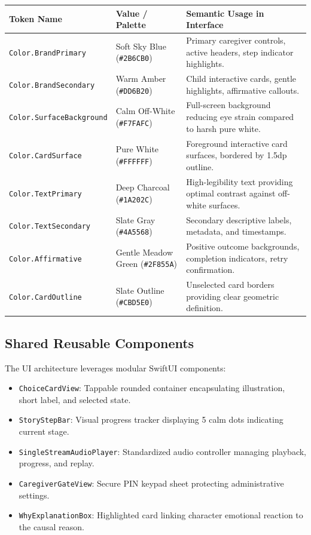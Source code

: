 \begin{xltabular}{\textwidth}{|p{3.2cm}|p{3.0cm}|X|}
\hline
\textbf{Token Name} & \textbf{Value / Palette} & \textbf{Semantic Usage in Interface} \\ \hline
\endhead
\texttt{Color.BrandPrimary} & Soft Sky Blue (\texttt{\#2B6CB0}) & Primary caregiver controls, active headers, step indicator highlights. \\ \hline
\texttt{Color.BrandSecondary} & Warm Amber (\texttt{\#DD6B20}) & Child interactive cards, gentle highlights, affirmative callouts. \\ \hline
\texttt{Color.SurfaceBackground} & Calm Off-White (\texttt{\#F7FAFC}) & Full-screen background reducing eye strain compared to harsh pure white. \\ \hline
\texttt{Color.CardSurface} & Pure White (\texttt{\#FFFFFF}) & Foreground interactive card surfaces, bordered by 1.5dp outline. \\ \hline
\texttt{Color.TextPrimary} & Deep Charcoal (\texttt{\#1A202C}) & High-legibility text providing optimal contrast against off-white surfaces. \\ \hline
\texttt{Color.TextSecondary} & Slate Gray (\texttt{\#4A5568}) & Secondary descriptive labels, metadata, and timestamps. \\ \hline
\texttt{Color.Affirmative} & Gentle Meadow Green (\texttt{\#2F855A}) & Positive outcome backgrounds, completion indicators, retry confirmation. \\ \hline
\texttt{Color.CardOutline} & Slate Outline (\texttt{\#CBD5E0}) & Unselected card borders providing clear geometric definition. \\ \hline
\end{xltabular}
\label{tab:c5_tokens}

\subsection{Shared Reusable Components}

The UI architecture leverages modular SwiftUI components:
\begin{itemize}
    \item \texttt{ChoiceCardView}: Tappable rounded container encapsulating illustration, short label, and selected state.
    \item \texttt{StoryStepBar}: Visual progress tracker displaying 5 calm dots indicating current stage.
    \item \texttt{SingleStreamAudioPlayer}: Standardized audio controller managing playback, progress, and replay.
    \item \texttt{CaregiverGateView}: Secure PIN keypad sheet protecting administrative settings.
    \item \texttt{WhyExplanationBox}: Highlighted card linking character emotional reaction to the causal reason.
\end{itemize}

